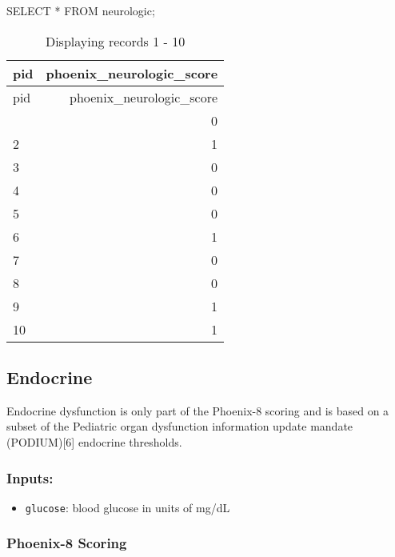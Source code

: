 \documentclass[
  letterpaper,
  DIV=11,
  numbers=noendperiod]{scrartcl}
\newenvironment{Shaded}{\begin{snugshade}}{\end{snugshade}}
\newcommand{\KeywordTok}[1]{\textcolor[rgb]{0.00,0.23,0.31}{#1}}
\newcommand{\NormalTok}[1]{\textcolor[rgb]{0.00,0.23,0.31}{#1}}
\newcommand{\OperatorTok}[1]{\textcolor[rgb]{0.37,0.37,0.37}{#1}}
\providecommand{\tightlist}{%
  \setlength{\itemsep}{0pt}\setlength{\parskip}{0pt}}\usepackage{longtable,booktabs,array}
\begin{document}
\begin{Shaded}
\begin{Highlighting}[]
\KeywordTok{SELECT} \OperatorTok{*} \KeywordTok{FROM}\NormalTok{ neurologic;}
\end{Highlighting}
\end{Shaded}

\begin{longtable}[]{@{}lr@{}}
\caption{Displaying records 1 - 10}\tabularnewline
\toprule\noalign{}
pid & phoenix\_neurologic\_score \\
\midrule\noalign{}
\endfirsthead
\toprule\noalign{}
pid & phoenix\_neurologic\_score \\
\midrule\noalign{}
\endhead
\bottomrule\noalign{}
\endlastfoot
1 & 0 \\
2 & 1 \\
3 & 0 \\
4 & 0 \\
5 & 0 \\
6 & 1 \\
7 & 0 \\
8 & 0 \\
9 & 1 \\
10 & 1 \\
\end{longtable}

\subsection{Endocrine}\label{endocrine}

Endocrine dysfunction is only part of the Phoenix-8 scoring and is based
on a subset of the Pediatric organ dysfunction information update
mandate (PODIUM){[}6{]} endocrine thresholds.

\subsubsection{Inputs:}\label{inputs-4}

\begin{itemize}
\tightlist
\item
  \texttt{glucose}: blood glucose in units of mg/dL
\end{itemize}

\subsubsection{Phoenix-8 Scoring}\label{phoenix-8-scoring}
\end{document}
